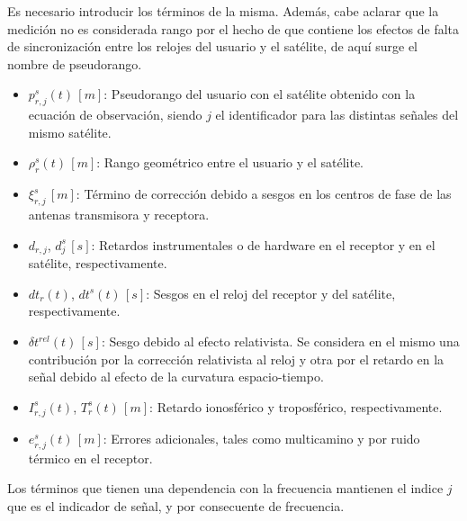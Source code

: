 \documentclass[a4paper,12pt,oneside,onecolumn,final,openright]{book}%
\begin{document}
	Es necesario introducir los términos de la misma. Además, cabe aclarar que la medición no es considerada rango por el hecho de que contiene los efectos de falta de sincronización entre los relojes del usuario y el satélite, de aquí surge el nombre de pseudorango. 
\begin{itemize}
	\item $p_{r,j}^s(t)\,[m]$: Pseudorango del usuario con el satélite obtenido con la ecuación de observación, siendo $j$ el identificador para las distintas señales del mismo satélite.
	\item $\rho_r^s(t)\,[m]$: Rango geométrico entre el usuario y el satélite.
	\item $\xi_{r,j}^s\,[m]$: Término de corrección debido a sesgos en los centros de fase de las antenas transmisora y receptora.
	\item $d_{r,j}$, $d_j^s\,[s]$: Retardos instrumentales o de hardware en el receptor y en el satélite, respectivamente.
	\item $dt_r(t)$, $dt^s(t)\,[s]$: Sesgos en el reloj del receptor y del satélite, respectivamente.
	\item $\delta t^{rel}(t)\,[s]$: Sesgo debido al efecto relativista. Se considera en el mismo una contribución por la corrección relativista al reloj y otra por el retardo en la señal debido al efecto de la curvatura espacio-tiempo.
	\item $I_{r,j}^s(t)$, $T_r^s(t)\,[m]$: Retardo ionosférico y troposférico, respectivamente.
	\item $e_{r,j}^s(t)\,[m]$: Errores adicionales, tales como multicamino y por ruido térmico en el receptor.
\end{itemize}
	Los términos que tienen una dependencia con la frecuencia mantienen el indice $j$ que es el indicador de señal, y por consecuente de frecuencia.
\end{document}

